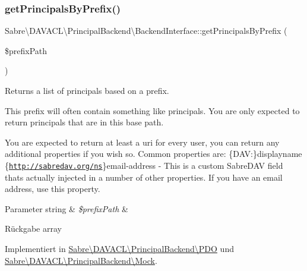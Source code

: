\subsubsection{\texorpdfstring{get\+Principals\+By\+Prefix()}{getPrincipalsByPrefix()}}
{\footnotesize\ttfamily Sabre\textbackslash{}\+D\+A\+V\+A\+C\+L\textbackslash{}\+Principal\+Backend\textbackslash{}\+Backend\+Interface\+::get\+Principals\+By\+Prefix (\begin{DoxyParamCaption}\item[{}]{\$prefix\+Path }\end{DoxyParamCaption})}

Returns a list of principals based on a prefix.

This prefix will often contain something like \textquotesingle{}principals\textquotesingle{}. You are only expected to return principals that are in this base path.

You are expected to return at least a \textquotesingle{}uri\textquotesingle{} for every user, you can return any additional properties if you wish so. Common properties are\+: \{D\+AV\+:\}displayname \{\href{http://sabredav.org/ns}{\tt http\+://sabredav.\+org/ns}\}email-\/address -\/ This is a custom Sabre\+D\+AV field that\textquotesingle{}s actually injected in a number of other properties. If you have an email address, use this property.


\begin{DoxyParams}[1]{Parameter}
string & {\em \$prefix\+Path} & \\
\hline
\end{DoxyParams}
\begin{DoxyReturn}{Rückgabe}
array 
\end{DoxyReturn}


Implementiert in \mbox{\hyperlink{class_sabre_1_1_d_a_v_a_c_l_1_1_principal_backend_1_1_p_d_o_aad0ecec88de52a79bb4a2f2dcb024079}{Sabre\textbackslash{}\+D\+A\+V\+A\+C\+L\textbackslash{}\+Principal\+Backend\textbackslash{}\+P\+DO}} und \mbox{\hyperlink{class_sabre_1_1_d_a_v_a_c_l_1_1_principal_backend_1_1_mock_aac5d118258774c5d15f7fb3f31041fda}{Sabre\textbackslash{}\+D\+A\+V\+A\+C\+L\textbackslash{}\+Principal\+Backend\textbackslash{}\+Mock}}.

\mbox{\label{interface_sabre_1_1_d_a_v_a_c_l_1_1_principal_backend_1_1_backend_interface_a541dc1b2f8968514abf0a0d1cefd0183}} 
